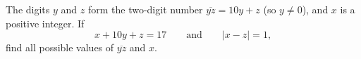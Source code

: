 The digits $y$ and $z$ form the two-digit number $\overline{yz}=10y+z$ (so $y\ne0$), and $x$ is a positive integer. If
\[x+10y+z=17\qquad\text{and}\qquad|x-z|=1,\]
find all possible values of $\overline{yz}$ and $x$.
